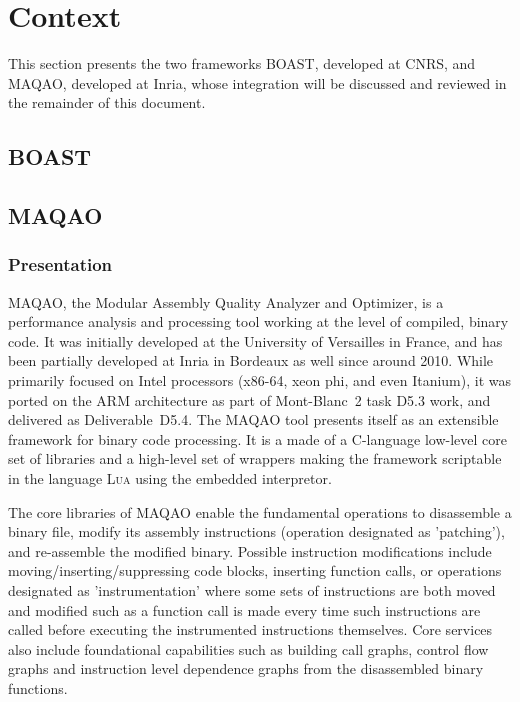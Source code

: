\documentclass[11pt, a4paper, twoside]{montblanc2}
\def\lua{\textsc{Lua}\xspace}
\begin{document}
\section{Context}\label{sec:context}

This section presents the two frameworks BOAST, developed at CNRS, and MAQAO, 
developed at Inria, whose integration will be discussed and reviewed in the 
remainder of this document.

\subsection{BOAST}



\subsection{MAQAO}

\subsubsection{Presentation}
MAQAO, the Modular Assembly Quality Analyzer and Optimizer, is a performance analysis and processing 
tool working at the level of compiled, binary code. It was initially developed at the University of 
Versailles in France, and has been partially developed at Inria in Bordeaux as well since around 
2010. While primarily focused on Intel processors (x86-64, xeon phi, and even Itanium), it was 
ported on the ARM architecture as part of Mont-Blanc~2 task D5.3 work, and delivered as 
Deliverable~D5.4. The MAQAO tool presents itself as an extensible framework for binary code 
processing. It is a made of a C-language low-level core set of libraries and a high-level set of 
wrappers making the framework scriptable in the language \lua using the embedded interpretor. 

The core libraries of MAQAO enable the fundamental operations to disassemble a binary file, modify 
its assembly instructions (operation designated as 'patching'), and re-assemble the modified binary. 
Possible instruction modifications include moving/inserting/suppressing code blocks, inserting 
function calls, or operations designated as 'instrumentation' where some sets of instructions are 
both moved and modified such as a function call is made every time such instructions are called 
before executing the instrumented instructions themselves. Core services also include foundational 
capabilities such as building call graphs, control flow graphs and instruction 
level dependence graphs from the disassembled binary functions.
\end{document}
